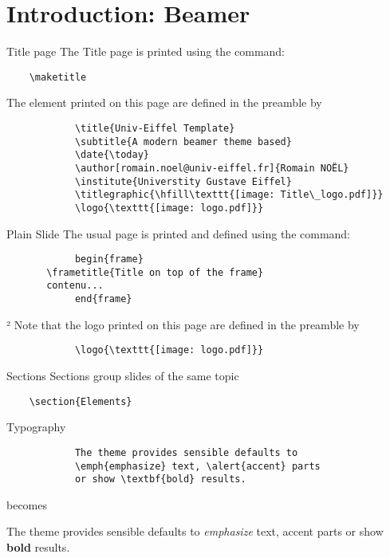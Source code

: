 \section{Introduction: Beamer}

	\begin{frame}[fragile]{Title page}
		The Title page is printed using the command:			
		\begin{verbatim}    \maketitle\end{verbatim}
		
		The element printed on this page are defined in the preamble by
		\begin{verbatim}
			\title{Univ-Eiffel Template}
			\subtitle{A modern beamer theme based}
			\date{\today}
			\author[romain.noel@univ-eiffel.fr]{Romain NOËL}
			\institute{Universtity Gustave Eiffel}
			\titlegraphic{\hfill\texttt{[image: Title\_logo.pdf]}}
			\logo{\texttt{[image: logo.pdf]}}
		\end{verbatim}
	\end{frame}
	
	\begin{frame}[fragile]{Plain Slide}
		The usual page is printed and defined using the command:			
		\begin{verbatim}
			begin{frame}
	   \frametitle{Title on top of the frame}
	   contenu...
			end{frame}
		\end{verbatim}
		²
		Note that the logo printed on this page are defined in the preamble by
		\begin{verbatim}
			\logo{\texttt{[image: logo.pdf]}}
		\end{verbatim}
	\end{frame}

	\begin{frame}[fragile]{Sections}
		Sections group slides of the same topic
		
		\begin{verbatim}    \section{Elements}\end{verbatim}
	\end{frame}

	\begin{frame}[fragile]{Typography}
		\begin{verbatim}
			The theme provides sensible defaults to
			\emph{emphasize} text, \alert{accent} parts
			or show \textbf{bold} results.
		\end{verbatim}
		
		\begin{center}becomes\end{center}
		
		The theme provides sensible defaults to \emph{emphasize} text,
		\alert{accent} parts or show \textbf{bold} results.
	\end{frame}
		
